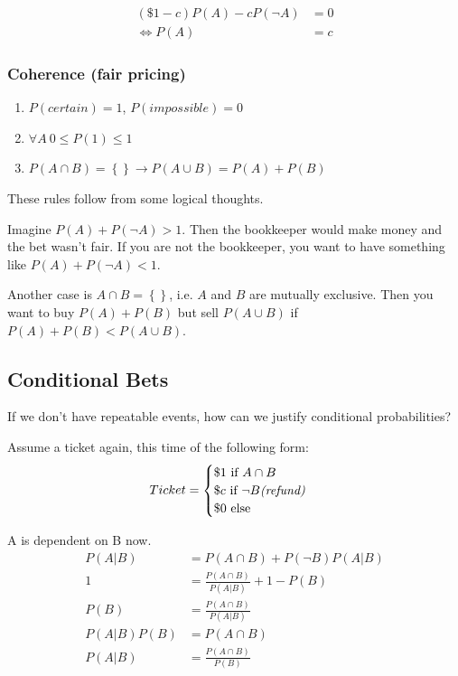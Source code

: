 \begin{align*}
\left(\$1 - c\right) P(A) - cP(\neg A) &= 0 \\
\Leftrightarrow P(A) &= c
\end{align*}

\subsubsection*{Coherence (fair pricing)}
\begin{enumerate}
	\item $P(certain) = 1$, $P(impossible) = 0$
  \item $\forall A\ 0 \leq P(1) \leq 1$
  \item $P(A \cap B) = \left\{\right\} \rightarrow P(A \cup B) = P(A) + P(B)$
\end{enumerate}

These rules follow from some logical thoughts.

Imagine $P(A) + P(\neg A) > 1$. Then the bookkeeper would make money and the bet wasn't fair. If you are not the bookkeeper, you want to have something like $P(A) + P(\neg A) < 1$.

Another case is $A \cap B = \left\{\right\}$, i.e. $A$ and $B$ are mutually exclusive. Then you want to buy $P(A)+P(B)$ but sell $P(A \cup B)$ if $P(A) + P(B) < P(A \cup B)$.

\subsection{Conditional Bets}
If we don't have repeatable events, how can we justify conditional probabilities?

Assume a ticket again, this time of the following form:
\begin{align*}
Ticket = 
  \begin{cases}
    \$1 \mbox{ if } A \cap B \\
    \$c \mbox{ if } \neg B \mbox{\textit{(refund)}} \\
    \$0 \mbox{ else}
  \end{cases}
\end{align*}

A is dependent on B now.
\begin{align*}
P(A|B)     &=       P(A \cap B)          + P(\neg B) P(A|B) \\
         1 &= \frac{P(A \cap B)}{P(A|B)} + 1 - P(B)         \\
      P(B) &= \frac{P(A \cap B)}{P(A|B)}                    \\
P(A|B)P(B) &=       P(A \cap B)                             \\
P(A|B)     &= \frac{P(A \cap B)}{P(B)}
\end{align*}

